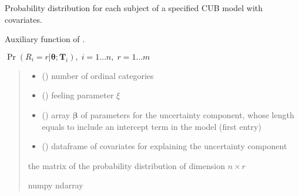 \documentclass[letterpaper,10pt,english]{sphinxmanual}
\begin{document}

\begin{fulllineitems}
\label{\detokenize{cubmods:cubmods.cub_y0.pmfi}}
\pysigstartsignatures
{}
\pysigstopsignatures
\sphinxAtStartPar
Probability distribution for each subject of a specified CUB model 
with covariates.

\sphinxAtStartPar
Auxiliary function of .

\sphinxAtStartPar
\(\Pr(R_i=r|\pmb\theta; \pmb T_i),\; i=1 \ldots n ,\; r=1 \ldots m\)
\begin{quote}\begin{description}
\begin{itemize}
\item {} 
\sphinxAtStartPar
{} () \textendash{} number of ordinal categories

\item {} 
\sphinxAtStartPar
{} () \textendash{} feeling parameter \(\xi\)

\item {} 
\sphinxAtStartPar
{} () \textendash{} array \(\pmb \beta\) of parameters for the uncertainty component, whose length equals 
 to include an intercept term in the model (first entry)

\item {} 
\sphinxAtStartPar
{} () \textendash{} dataframe of covariates for explaining the uncertainty component

\end{itemize}

\sphinxAtStartPar
the matrix of the probability distribution of dimension \(n \times r\)

\sphinxAtStartPar
numpy ndarray

\end{description}\end{quote}

\end{fulllineitems}
\end{document}
